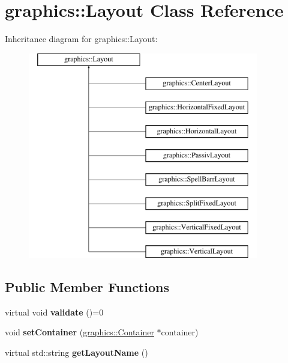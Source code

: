 \hypertarget{classgraphics_1_1_layout}{\section{graphics\-:\-:Layout Class Reference}
\label{classgraphics_1_1_layout}
}
Inheritance diagram for graphics\-:\-:Layout\-:\begin{figure}[H]
\begin{center}
\leavevmode
\includegraphics[height=9.000000cm]{classgraphics_1_1_layout}
\end{center}
\end{figure}
\subsection*{Public Member Functions}
\begin{DoxyCompactItemize}
\item 
\hypertarget{classgraphics_1_1_layout_a24f8e0b830024563092710dac539fbbc}{virtual void {\bfseries validate} ()=0}\label{classgraphics_1_1_layout_a24f8e0b830024563092710dac539fbbc}

\item 
\hypertarget{classgraphics_1_1_layout_ad65a42946ff241e08e26231c2aaeed20}{void {\bfseries set\-Container} (\hyperlink{classgraphics_1_1_container}{graphics\-::\-Container} $\ast$container)}\label{classgraphics_1_1_layout_ad65a42946ff241e08e26231c2aaeed20}

\item 
\hypertarget{classgraphics_1_1_layout_a8b259164bdb21dff6b8ec61b6d2e7d82}{virtual std\-::string {\bfseries get\-Layout\-Name} ()}\label{classgraphics_1_1_layout_a8b259164bdb21dff6b8ec61b6d2e7d82}

\end{DoxyCompactItemize}
